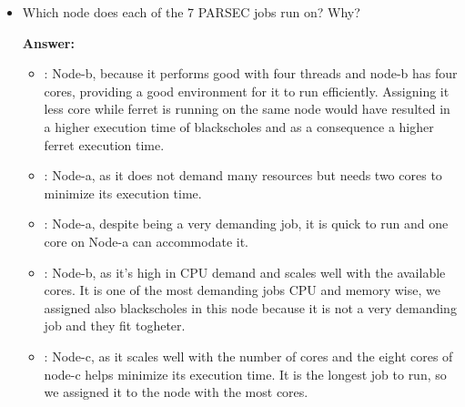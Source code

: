 \begin{enumerate}
\begin{itemize}
        Secondly, after consulting the documentation, we discovered that the e2-standard-8 machine, despite having the highest number of cores, has weaker CPUs compared to the other machines. Therefore, we decided to reserve the faster machines for Parsec jobs.
        
        We requested at least 0.5 CPU and 32 MB memory for memcached and limited  to maximum 0.75 CPU and 64 MB respectively using Kubernetes. This configuration prevented other Parsec jobs running on the same machine and same core from using all the CPUs and memory which would have resulted in a higher latency for memcached.

        \item Which node does each of the 7 PARSEC jobs run on? Why?

        \textbf{Answer:}
        \begin{itemize}
            \item {}: %
            Node-b, because it performs good with four threads and node-b has four cores, providing a good environment for it to run efficiently. Assigning it less core while ferret is running on the same node would have resulted in a higher execution time of blackscholes and as a consequence a higher ferret execution time.
            
            \item {}: %
            Node-a, as it does not demand many resources but needs two cores to minimize its execution time.

            \item {}: %
            Node-a, despite being a very demanding job, it is quick to run and one core on Node-a can accommodate it.
            
            \item {}: %
            Node-b, as it's high in CPU demand and scales well with the available cores. It is one of the most demanding jobs CPU and memory wise, we assigned also blackscholes in this node because it is not a very demanding job and they fit togheter.

            \item {}: %
            Node-c, as it scales well with the number of cores and the eight cores of node-c helps minimize its execution time. It is the longest job to run, so we assigned it to the node with the most cores. 
            

\end{itemize}
\end{itemize}
\end{enumerate}

